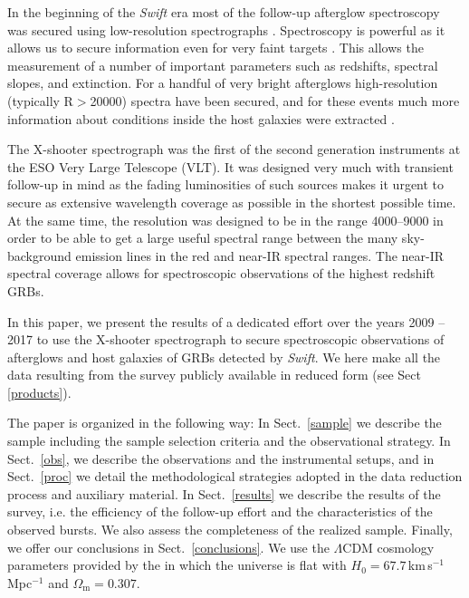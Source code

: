 \documentclass[longauth]{aa}    %
\begin{document}
In the beginning of the {\it Swift} era most of the follow-up afterglow
spectroscopy was secured using low-resolution spectrographs \citep[typically
$R=\lambda/\Delta\lambda$$<$1000, e.g.,][]{Fynbo2009}. Spectroscopy is powerful
as it allows us to secure information even for very faint targets
\citep{Kruhler2012}. This allows the measurement of a number of important
parameters such as redshifts, spectral slopes, and extinction. For a handful of
very bright afterglows high-resolution (typically R$>$20000) spectra have been
secured, and for these events much more information about conditions inside the
host galaxies were extracted \citep[e.g.,][]{Fiore2005, Thone2007,
	Prochaska2007, Vreeswijk2007, DElia2009, Castro-Tirado2010}.

The X-shooter spectrograph \citep{Vernet2011} was the first of the second
generation instruments at the ESO Very Large Telescope (VLT). It was designed
very much with transient follow-up in mind as the fading luminosities of
such sources makes it urgent to secure as extensive wavelength coverage as possible in the
shortest possible time. At the same time, the resolution was designed to be in
the range 4000--9000 in order to be able to get a large useful spectral range
between the many sky-background emission lines in the red and near-IR spectral
ranges. The near-IR spectral coverage allows for spectroscopic observations of
the highest redshift GRBs.

In this paper, we present the results of a dedicated effort over the years 2009
-- 2017 to use the X-shooter spectrograph to secure spectroscopic observations
of afterglows and host galaxies of GRBs detected by {\it Swift}. We here make
all the data resulting from the survey publicly available in reduced form (see Sect
\ref{products}).

The paper is organized in the following way: In Sect.~\ref{sample} we describe
the sample including the sample selection criteria and the observational
strategy. In Sect.~\ref{obs}, we describe the observations and the instrumental
setups, and in Sect.~\ref{proc} we detail the methodological strategies adopted
in the data reduction process and auxiliary material. In Sect.~\ref{results} we
describe the results of the survey, i.e. the efficiency of the follow-up effort
and the characteristics of the observed bursts. We also assess the
completeness of the realized sample. Finally, we offer our conclusions
in Sect.~\ref{conclusions}. We use the $\Lambda$CDM cosmology parameters
provided by the \citet{Planck2015} in which the universe is flat with $H_0 =
67.7$\,km\,s$^{-1}$ Mpc$^{-1}$ and $\Omega_\mathrm{m} = 0.307$.
\end{document}
